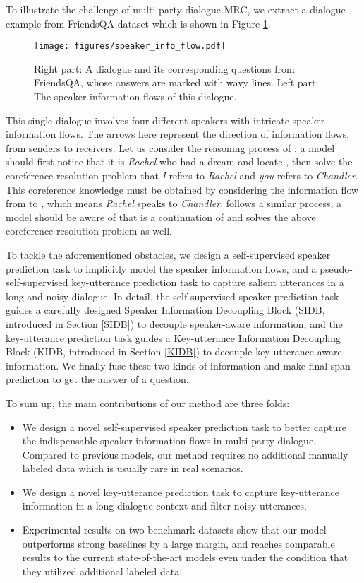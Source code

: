 \documentclass[11pt]{article}
\begin{document}
	To illustrate the challenge of multi-party dialogue MRC, we extract a dialogue example from FriendsQA dataset \citep{yang2019friendsqa} which is shown in Figure \ref{speaker_info_flow}.
	\begin{figure}[tbp]
		\texttt{[image: figures/speaker\_info\_flow.pdf]}
		\centering
		\caption{Right part: A dialogue and its corresponding questions from FriendsQA, whose answers are marked with wavy lines. Left part: The speaker information flows of this dialogue.} 
		\label{speaker_info_flow}
	\end{figure}
	This single dialogue involves four different speakers with intricate speaker information flows. The arrows here represent the direction of information flows, from senders to receivers. Let us consider the reasoning process of : a model should first notice that it is \emph{Rachel} who had a dream and locate , then solve the coreference resolution problem that \emph{I} refers to \emph{Rachel} and \emph{you} refers to \emph{Chandler}. This coreference knowledge must be obtained by considering the information flow from  to , which means \emph{Rachel} speaks to \emph{Chandler}.  follows a similar process, a model should be aware of that  is a continuation of  and solves the above coreference resolution problem as well.
	
	To tackle the aforementioned obstacles, we design a self-supervised speaker prediction task to implicitly model the speaker information flows, and a pseudo-self-supervised key-utterance prediction task to capture salient utterances in a long and noisy dialogue. In detail, the self-supervised speaker prediction task guides a carefully designed Speaker Information Decoupling Block (SIDB, introduced in Section \ref{SIDB}) to decouple speaker-aware information, and the key-utterance prediction task guides a Key-utterance Information Decoupling Block (KIDB, introduced in Section \ref{KIDB}) to decouple key-utterance-aware information. We finally fuse these two kinds of information and make final span prediction to get the answer of a question.
	
	To sum up, the main contributions of our method are three folds:
	\begin{itemize}[leftmargin=*, topsep=1pt]
		\setlength{\itemsep}{0pt}
		\setlength{\parsep}{0pt}
		\setlength{\parskip}{0pt}
		\item We design a novel self-supervised speaker prediction task to better capture the indispensable speaker information flows in multi-party dialogue. Compared to previous models, our method requires no additional manually labeled data which is usually rare in real scenarios.
		\item We design a novel key-utterance prediction task to capture key-utterance information in a long dialogue context and filter noisy utterances.
		\item Experimental results on two benchmark datasets show that our model outperforms strong baselines by a large margin, and reaches comparable results to the current state-of-the-art models even under the condition that they utilized additional labeled data.
	\end{itemize}
	
\end{document}
